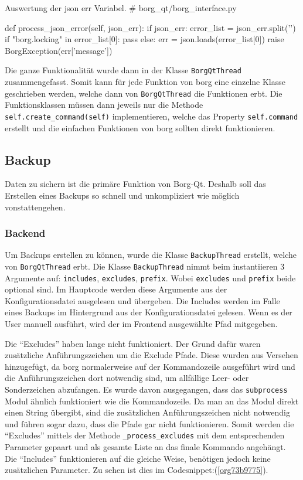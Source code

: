 \begin{sexylisting}[label=orgb83002e]{Auswertung der json err Variabel.}
# borg_qt/borg_interface.py

def process_json_error(self, json_err):
    if json_err:
        error_list = json_err.split('\n')
        if "borg.locking" in error_list[0]:
            pass
        else:
            err = json.loads(error_list[0])
            raise BorgException(err['message'])
\end{sexylisting}

Die ganze Funktionalität wurde dann in der Klasse \texttt{BorgQtThread}
zusammengefasst. Somit kann für jede Funktion von \gls{borg} eine einzelne Klasse
geschrieben werden, welche dann von \texttt{BorgQtThread} die Funktionen erbt. Die
Funktionsklassen müssen dann jeweils nur die Methode
\texttt{self.create\_command(self)} implementieren, welche das Property \texttt{self.command}
erstellt und die einfachen Funktionen von \gls{borg} sollten direkt funktionieren.
\newpage
\subsection{Backup}
\label{sec:org89c69ff}

Daten zu sichern ist die primäre Funktion von Borg-Qt. Deshalb soll das
Erstellen eines Backups so schnell und unkompliziert wie möglich
vonstattengehen.

\subsubsection{Backend}
\label{sec:orgf0c2da8}

Um Backups erstellen zu können, wurde die Klasse \texttt{BackupThread} erstellt, welche
von \texttt{BorgQtThread} erbt. Die Klasse \texttt{BackupThread} nimmt beim instantiieren 3
Argumente auf: \texttt{includes}, \texttt{excludes}, \texttt{prefix}. Wobei \texttt{excludes} und \texttt{prefix}
beide optional sind. Im Hauptcode werden diese Argumente aus der
Konfigurationsdatei ausgelesen und übergeben. Die Includes werden im Falle
eines Backups im Hintergrund aus der Konfigurationsdatei gelesen. Wenn es
der User manuell ausführt, wird der im Frontend ausgewählte Pfad mitgegeben.

Die "`Excludes"' haben lange nicht funktioniert. Der Grund dafür waren zusätzliche
Anführungszeichen um die Exclude Pfade. Diese wurden aus Versehen hinzugefügt,
da \gls{borg} normalerweise auf der Kommandozeile ausgeführt wird und die
Anführungszeichen dort notwendig sind, um allfällige Leer- oder Sonderzeichen
abzufangen. Es wurde davon ausgegangen, dass das \texttt{subprocess} Modul ähnlich
funktioniert wie die Kommandozeile. Da man an das Modul direkt einen String
übergibt, sind die zusätzlichen Anführungszeichen nicht notwendig und führen
sogar dazu, dass die Pfade gar nicht funktionieren. Somit werden die "`Excludes"'
mittels der Methode \texttt{\_process\_excludes} mit dem entsprechenden Parameter
gepaart und als gesamte Liste an das finale Kommando angehängt. Die "`Includes"'
funktionieren auf die gleiche Weise, benötigen jedoch keine zusätzlichen
Parameter. Zu sehen ist dies im Codesnippet:(\ref{org73b9775}).

